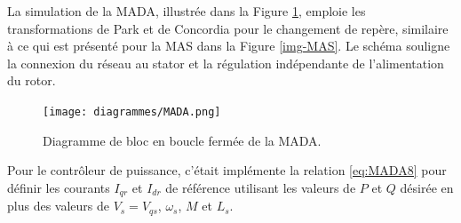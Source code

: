 La simulation de la MADA, illustrée dans la Figure \ref{img-MADA}, emploie les transformations de Park et de Concordia pour le changement de repère, similaire à ce qui est présenté pour la MAS dans la Figure \ref{img-MAS}. Le schéma souligne la connexion du réseau au stator et la régulation indépendante de l'alimentation du rotor.


\begin{figure}[!h]
    \centering
    \texttt{[image: diagrammes/MADA.png]} 
    \caption{Diagramme de bloc en boucle fermée de la MADA.}
    \label{img-MADA}
\end{figure}

Pour le contrôleur de puissance, c'était implémente la relation \ref{eq:MADA8} pour définir les courants $I_{qr}$ et $I_{dr}$ de référence utilisant les valeurs de $P$ et $Q$ désirée en plus des valeurs de $V_{s} = V_{qs}$, $\omega_s$, $M$ et $L_s$.




